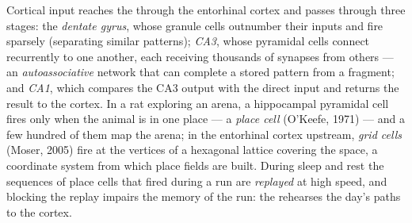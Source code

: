 \begin{definition}\label{def:b3:learning-memory:hippocampus}
Cortical input reaches the  through the entorhinal cortex
and passes through three stages: the \emph{dentate gyrus}, whose
granule cells outnumber their inputs and fire sparsely (separating
similar patterns); \emph{CA3}, whose pyramidal cells connect
recurrently to one another, each receiving thousands of synapses from
others --- an \emph{autoassociative} network that can complete a stored
pattern from a fragment; and \emph{CA1}, which compares the CA3 output
with the direct input and returns the result to the cortex. In a rat
exploring an arena, a hippocampal pyramidal cell fires only when the
animal is in one place --- a \emph{place cell} (O'Keefe, 1971) --- and a
few hundred of them map the arena; in the entorhinal cortex upstream,
\emph{grid cells} (Moser, 2005) fire at the vertices of a hexagonal
lattice covering the space, a coordinate system from which place fields
are built. During sleep and rest the sequences of place cells that
fired during a run are \emph{replayed} at high speed, and blocking the
replay impairs the memory of the run: the  rehearses the
day's paths to the cortex.
\end{definition}

